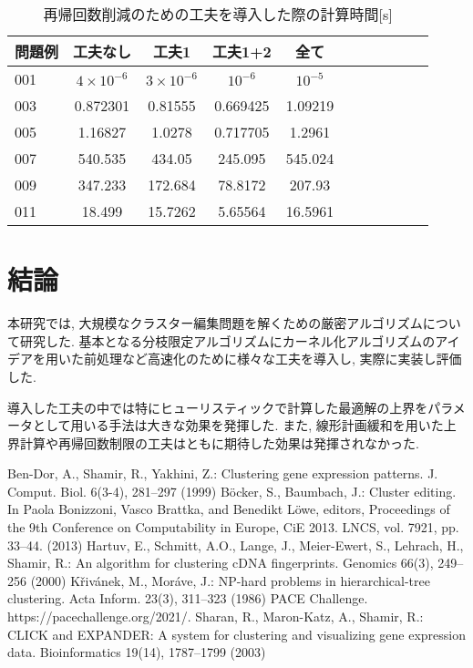 \documentclass[10pt,a4j,twocolumn, dvipdfmx]{bxjsarticle}
\begin{document}
\begin{table}[H]
    \caption{再帰回数削減のための工夫を導入した際の計算時間[s]}
    \label{table:data_type}
    \centering
    \begin{tabular}{l|cccccccccr}
        \hline
        問題例  & 工夫なし & 工夫1 & 工夫1+2  & 全て\\
        \hline
        001 & $4 \times 10^{-6}$ & $3 \times 10^{-6}$ & $10^{-6}$ & $10^{-5}$\\
        003 & 0.872301 & 0.81555 & 0.669425 & 1.09219\\
        005 & 1.16827 & 1.0278 & 0.717705 & 1.2961\\
        007 & 540.535 & 434.05 & 245.095 & 545.024\\
        009 & 347.233 & 172.684 & 78.8172 & 207.93\\
        011 & 18.499 & 15.7262 & 5.65564& 16.5961\\
        \hline
    \end{tabular}
\end{table}

\section{結論}
本研究では, 大規模なクラスター編集問題を解くための厳密アルゴリズムについて研究した.
基本となる分枝限定アルゴリズムにカーネル化アルゴリズムのアイデアを用いた前処理など高速化のために様々な工夫を導入し, 実際に実装し評価した.\par
導入した工夫の中では特にヒューリスティックで計算した最適解の上界をパラメータとして用いる手法は大きな効果を発揮した.
また, 線形計画緩和を用いた上界計算や再帰回数制限の工夫はともに期待した効果は発揮されなかった.\par
\begin{thebibliography}{}
    \bibitem{} Ben-Dor, A., Shamir, R., Yakhini, Z.: Clustering gene expression patterns. J.
    Comput. Biol. 6(3-4), 281--297 (1999)
    \bibitem{} Böcker, S., Baumbach, J.: Cluster editing. In Paola Bonizzoni, Vasco Brattka, and
    Benedikt Löwe, editors, Proceedings of the 9th Conference on Computability in Europe, CiE 2013. LNCS, vol. 7921, pp. 33--44. (2013)
    \bibitem{} Hartuv, E., Schmitt, A.O., Lange, J., Meier-Ewert, S., Lehrach, H., Shamir, R.:
    An algorithm for clustering cDNA fingerprints. Genomics 66(3), 249--256 (2000)
    \bibitem{} Křivánek, M., Moráve, J.: NP-hard problems in hierarchical-tree clustering. Acta
    Inform. 23(3), 311--323 (1986)
    \bibitem{} PACE Challenge. \\https://pacechallenge.org/2021/.
    \bibitem{} Sharan, R., Maron-Katz, A., Shamir, R.: CLICK and EXPANDER: A system for
    clustering and visualizing gene expression data. Bioinformatics 19(14), 1787--1799
    (2003)
\end{thebibliography}
\end{document}
